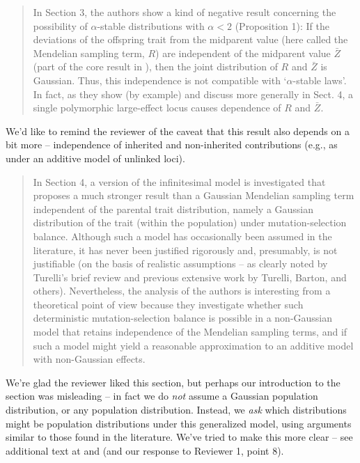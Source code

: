\begin{quote}
In Section 3, the authors show a kind of negative result concerning the possibility of $\alpha$-stable 
distributions with $\alpha < 2$ (Proposition 1): If the deviations of the offspring trait
from the midparent value (here called the Mendelian sampling term, $R$) are independent
of the midparent value $\bar Z$ (part of the core result in \citet{barton2017infinitesimal}), then the joint
distribution of $R$ and $\bar Z$ is Gaussian. Thus, this independence is not compatible with ‘$\alpha$-stable 
laws’. In fact, as they show (by example) and discuss more generally in Sect. 4, a
single polymorphic large-effect locus causes dependence of $R$ and $\bar Z$.
\end{quote}

We'd like to remind the reviewer of the caveat that this result
also depends on a bit more -- independence of inherited and non-inherited contributions
(e.g., as under an additive model of unlinked loci).

\begin{quote}
In Section 4, a version of the infinitesimal model is investigated that proposes a much
stronger result than a Gaussian Mendelian sampling term independent of the parental
trait distribution, namely a Gaussian distribution of the trait (within the population)
under mutation-selection balance. Although such a model has occasionally been assumed
in the literature, it has never been justified rigorously and, presumably, is not justifiable
(on the basis of realistic assumptions – as clearly noted by Turelli’s brief review and
previous extensive work by Turelli, Barton, and others). Nevertheless, the analysis of the
authors is interesting from a theoretical point of view because they investigate whether
such deterministic mutation-selection balance is possible in a non-Gaussian model that
retains independence of the Mendelian sampling terms, and if such a model might yield a
reasonable approximation to an additive model with non-Gaussian effects.
\end{quote}

We're glad the reviewer liked this section,
but perhaps our introduction to the section was misleading --
in fact we do \emph{not} assume a Gaussian population distribution,
or any population distribution.
Instead, we \emph{ask} which distributions might be population distributions
under this generalized model,
using arguments similar to those found in the literature.
We've tried to make this more clear -- see additional text at 
and 
(and our response to Reviewer 1, point 8).


